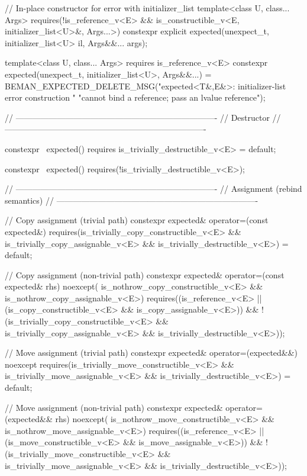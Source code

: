 \begin{codeblock}
{{    // In-place constructor for error with initializer_list
    template<class U, class... Args>
      requires(!is_reference_v<E> && is_constructible_v<E, initializer_list<U>&, Args...>)
    constexpr explicit expected(unexpect_t, initializer_list<U> il, Args&&... args);

    template<class U, class... Args>
      requires is_reference_v<E>
    constexpr expected(unexpect_t, initializer_list<U>, Args&&...) =
        BEMAN_EXPECTED_DELETE_MSG("expected<T&,E&>: initializer-list error construction "
                                  "cannot bind a reference; pass an lvalue reference");

    // -------------------------------------------------------------------------
    // Destructor
    // -------------------------------------------------------------------------

    constexpr ~expected()
      requires is_trivially_destructible_v<E>
    = default;

    constexpr ~expected()
      requires(!is_trivially_destructible_v<E>);

    // -------------------------------------------------------------------------
    // Assignment (rebind semantics)
    // -------------------------------------------------------------------------

    // Copy assignment (trivial path)
    constexpr expected& operator=(const expected&)
      requires(is_trivially_copy_constructible_v<E> &&
               is_trivially_copy_assignable_v<E> && is_trivially_destructible_v<E>)
    = default;

    // Copy assignment (non-trivial path)
    constexpr expected& operator=(const expected& rhs) noexcept(
        is_nothrow_copy_constructible_v<E> && is_nothrow_copy_assignable_v<E>)
      requires((is_reference_v<E> ||
                (is_copy_constructible_v<E> && is_copy_assignable_v<E>)) &&
               !(is_trivially_copy_constructible_v<E> &&
                 is_trivially_copy_assignable_v<E> && is_trivially_destructible_v<E>));

    // Move assignment (trivial path)
    constexpr expected& operator=(expected&&) noexcept
      requires(is_trivially_move_constructible_v<E> &&
               is_trivially_move_assignable_v<E> && is_trivially_destructible_v<E>)
    = default;

    // Move assignment (non-trivial path)
    constexpr expected& operator=(expected&& rhs) noexcept(
        is_nothrow_move_constructible_v<E> && is_nothrow_move_assignable_v<E>)
      requires((is_reference_v<E> ||
                (is_move_constructible_v<E> && is_move_assignable_v<E>)) &&
               !(is_trivially_move_constructible_v<E> &&
                 is_trivially_move_assignable_v<E> && is_trivially_destructible_v<E>));

}}
\end{codeblock}
